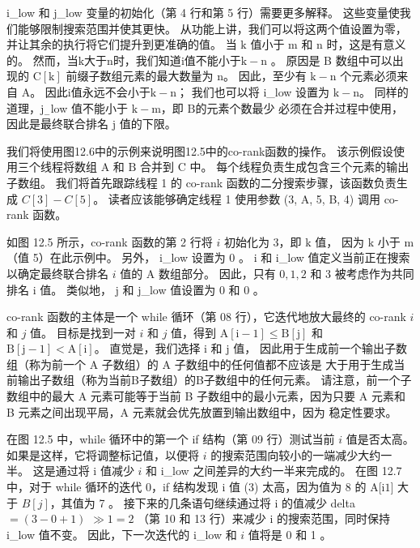 i\_low 和 j\_low 变量的初始化（第 4 行和第 5 行）需要更多解释。 
这些变量使我们能够限制搜索范围并使其更快。 从功能上讲，我们可以将这两个值设置为零，并让其余的执行将它们提升到更准确的值。 
当 $\mathrm{k}$ 值小于 $\mathrm{m}$ 和 $\mathrm{n}$ 时，这是有意义的。 
然而，当$\mathrm{k}$大于$\mathrm{n}$时，我们知道$\mathrm{i}$值不能小于$\mathrm{k}-\mathrm{n}$ 。 
原因是 B 数组中可以出现的 $\mathrm{C}[\mathrm{k}]$ 前缀子数组元素的最大数量为 $\mathrm{n}$。 
因此，至少有 $\mathrm{k}-\mathrm{n}$ 个元素必须来自 $\mathrm{A}$。 
因此$\mathrm{i}$值永远不会小于$\mathrm{k}-\mathrm{n}$； 
我们也可以将 i\_low 设置为 $\mathrm{k}-\mathrm{n}$。 
同样的道理，$\mathrm{j}_{-}$low 值不能小于 $\mathrm{k}-\mathrm{m}$，即 $\mathrm{B 的元素个数最少 }$ 必须在合并过程中使用，因此是最终联合排名 $\mathrm{j}$ 值的下限。

我们将使用图12.6中的示例来说明图12.5中的co-rank函数的操作。 
该示例假设使用三个线程将数组 $\mathrm{A}$ 和 $\mathrm{B}$ 合并到 $\mathrm{C}$ 中。 
每个线程负责生成包含三个元素的输出子数组。 
我们将首先跟踪线程 1 的 co-rank 函数的二分搜索步骤，该函数负责生成 $C[3]-C[5]$。 
读者应该能够确定线程 1 使用参数 (3, A, 5, B, 4) 调用 co-rank 函数。

如图 12.5 所示，co-rank 函数的第 2 行将 $i$ 初始化为 3，即 $\mathrm{k}$ 值，
因为 $\mathrm{k}$ 小于 $\mathrm{ m}$（值 5）在此示例中。 另外， i\_low 设置为 0 。 
$\mathrm{i}$ 和 i\_low 值定义当前正在搜索以确定最终联合排名 $i$ 值的 A 数组部分。 
因此，只有 $0,1,2$ 和 3 被考虑作为共同排名 i 值。 类似地， $\mathrm{j}$ 和 j\_low 值设置为 0 和 0 。

co-rank 函数的主体是一个 while 循环（第 08 行），它迭代地放大最终的 co-rank $i$ 和 $j$ 值。 
目标是找到一对 $i$ 和 $j$ 值，得到 $\mathrm{A}[\mathrm{i}-1] \leq \mathrm{B}[\mathrm{j}]$ 和 $\mathrm{B}[\mathrm{j}-1]<\mathrm{A}[\mathrm{i}]$。 
直觉是，我们选择 $\mathrm{i}$ 和 $\mathrm{j}$ 值，
因此用于生成前一个输出子数组（称为前一个 A 子数组）的 A 子数组中的任何值都不应该是 大于用于生成当前输出子数组（称为当前B子数组）的B子数组中的任何元素。 
请注意，前一个子数组中的最大 A 元素可能等于当前 B 子数组中的最小元素，因为只要 A 元素和 B 元素之间出现平局，A 元素就会优先放置到输出数组中，因为 稳定性要求。

在图 12.5 中，while 循环中的第一个 if 结构（第 09 行）测试当前 $i$ 值是否太高。 
如果是这样，它将调整标记值，以便将 $i$ 的搜索范围向较小的一端减少大约一半。 
这是通过将 i 值减少 $i$ 和 i\_low 之间差异的大约一半来完成的。 
在图 12.7 中，对于 while 循环的迭代 0，if 结构发现 i 值 (3) 太高，因为值为 8 的 A[i$1]$ 大于 $B[j ]$，其值为 7 。 
接下来的几条语句继续通过将 i 的值减少 delta $=(3-0+1)$ $\gg 1=2$ （第 10 和 13 行）来减少 i 的搜索范围，同时保持 i\_low 值不变。 因此，下一次迭代的 i\_low 和 $i$ 值将是 0 和 1 。

